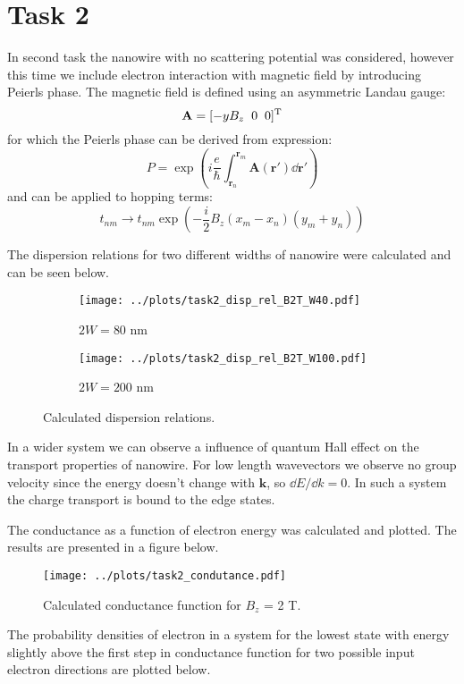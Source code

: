 \documentclass[12pt,a4]{article}
\begin{document}
\section*{Task 2}

In second task the nanowire with no scattering potential was considered, however this time we include electron interaction with magnetic field by introducing Peierls phase. The magnetic field is defined using an asymmetric Landau gauge:
\[\mathbf{A} = [-yB_z \;\; 0 \;\; 0]^{\text{T}}\]
for which the Peierls phase can be derived from expression:
\[P = \exp(i\frac{e}{\hbar} \int_{\mathbf{r}_n}^{\mathbf{r}_m}\mathbf{A}(\mathbf{r'})\dd\mathbf{r'})\]
and can be applied to hopping terms:
\[t_{nm} \to t_{nm}\exp(-\frac{i}{2}B_z(x_m - x_n)(y_m+y_n))\]

The dispersion relations for two different widths of nanowire were calculated and can be seen below.

\begin{figure}[H]
	\begin{subfigure}{.5\textwidth}
		\texttt{[image: ../plots/task2\_disp\_rel\_B2T\_W40.pdf]}
		\caption{$2W= 80$ nm}
	\end{subfigure}
	\begin{subfigure}{.5\textwidth}
		\texttt{[image: ../plots/task2\_disp\_rel\_B2T\_W100.pdf]}
		\caption{$2W= 200$ nm}
	\end{subfigure}
	\caption{Calculated dispersion relations.}
\end{figure}

In a wider system we can observe a influence of quantum Hall effect on the transport properties of nanowire. For low length wavevectors we observe no group velocity since the energy doesn't change with $ \mathbf{k} $, so $\dd E / \dd k = 0$. In such a system the charge transport is bound to the edge states.

The conductance as a function of electron energy  was calculated and plotted. The results are presented in a figure below.

\begin{figure}[H]
	\texttt{[image: ../plots/task2\_condutance.pdf]}
	\caption{Calculated conductance function for $ B_z $ = 2 T.}
\end{figure}

The probability densities of electron in a system for the lowest state with energy slightly above the first step in conductance function for two possible input electron directions are plotted below.
\end{document}
